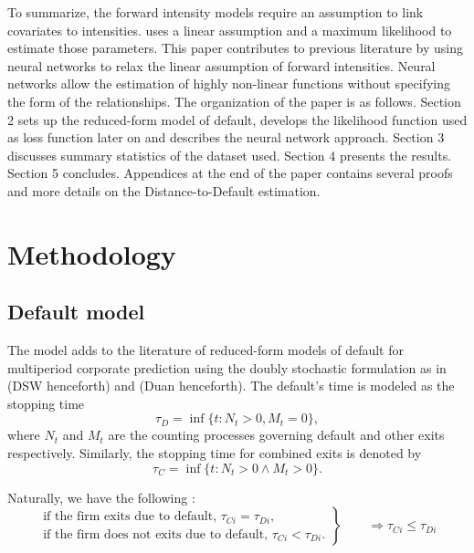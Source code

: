 To summarize, the forward intensity models require an assumption to link covariates to intensities. \citet{Duan2012} uses a linear assumption and a maximum likelihood to estimate those parameters. This paper contributes to previous literature by using neural networks to relax the linear assumption of forward intensities. Neural networks allow the estimation of highly non-linear functions without specifying the form of the relationships. The organization of the paper is as follows. Section 2 sets up the reduced-form model of default, develops the likelihood function used as loss function later on and describes the neural network approach. Section 3 discusses summary statistics of the dataset used. Section 4 presents the results. Section 5 concludes. Appendices at the end of the paper contains several proofs and more details on the Distance-to-Default estimation.


\section{Methodology}
\label{S:2}

\subsection{Default model}
\label{SS:2-1}

The model adds to the literature of reduced-form models of default for multiperiod corporate prediction using the doubly stochastic formulation as in \citet{DSW} (DSW henceforth) and \citet{Duan2012} (Duan henceforth). The default's time is modeled as the stopping time 
\begin{equation}
\tau_D = \inf\{t : N_t >0 , M_t = 0\},
\end{equation}
where $N_t$ and $M_t$ are the counting processes governing default and other exits respectively. Similarly, the stopping time for combined exits is denoted by
\begin{equation}
\tau_C = \inf\{t : N_t >0 \wedge M_t > 0\}.
\end{equation}

\noindent Naturally, we have the following :
\begin{equation*}
 \left.\begin{aligned}
        \text{if the firm exits due to default, } \tau_{Ci} = \tau_{Di},\\
        \text{if the firm does not exits due to default, } \tau_{Ci} < \tau_{Di}.
       \end{aligned}
 \right\}
 \qquad \text{$\Rightarrow \tau_{Ci} \leq \tau_{Di}$}
\end{equation*}


